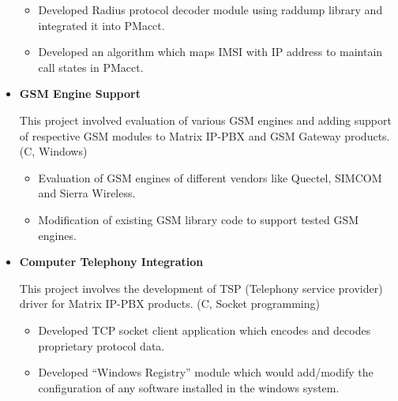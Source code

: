 \documentclass[letterpaper,11pt]{article}
\newcommand{\resitem}[1]{\item #1 \vspace{-2pt}}
\begin{document}
\begin{itemize}
\begin{itemize}
	    \resitem{Developed Radius protocol decoder module using raddump library and integrated it into PMacct.}
	    
	    \resitem{Developed an algorithm which maps IMSI with IP address to maintain call states in PMacct.}
	    
	\end{itemize}
	
\item
	\textbf{GSM Engine Support}
	
	This project involved evaluation of various GSM engines and adding support of respective GSM modules to Matrix IP-PBX and GSM Gateway products. (C, Windows)
	
	\begin{itemize}
	    \resitem{Evaluation of GSM engines of different vendors like Quectel, SIMCOM and Sierra Wireless.}
	    
	    \resitem{Modification of existing GSM library code to support tested GSM engines.}
	
	\end{itemize}
	
\item
   \textbf{Computer Telephony Integration}
    
    This project involves the development of TSP (Telephony service provider) driver for Matrix IP-PBX products. (C, Socket programming)
    
	\begin{itemize}
	    \resitem{Developed TCP socket client application which encodes and decodes proprietary protocol data.}
	    
	    \resitem{Developed “Windows Registry” module which would add/modify the configuration of any software installed in the windows system.}
	    
	\end{itemize}
	
\end{itemize}
\end{document}
